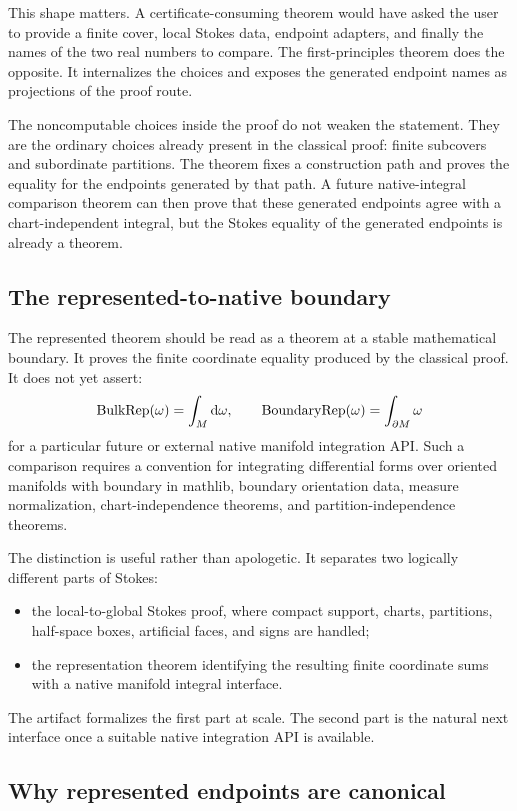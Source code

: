 This shape matters.  A certificate-consuming theorem would have asked the user
to provide a finite cover, local Stokes data, endpoint adapters, and finally
the names of the two real numbers to compare.  The first-principles theorem
does the opposite.  It internalizes the choices and exposes the generated
endpoint names as projections of the proof route.

The noncomputable choices inside the proof do not weaken the statement.  They
are the ordinary choices already present in the classical proof: finite
subcovers and subordinate partitions.  The theorem fixes a construction path
and proves the equality for the endpoints generated by that path.  A future
native-integral comparison theorem can then prove that these generated
endpoints agree with a chart-independent integral, but the Stokes equality of
the generated endpoints is already a theorem.

\subsection{The represented-to-native boundary}

The represented theorem should be read as a theorem at a stable mathematical
boundary.  It proves the finite coordinate equality produced by the classical
proof.  It does not yet assert:
\[
  \operatorname{BulkRep}(\omega) = \int_M \mathrm{d}\omega,
  \qquad
  \operatorname{BoundaryRep}(\omega) = \int_{\partial M} \omega
\]
for a particular future or external native manifold integration API.  Such a
comparison requires a convention for integrating differential forms over
oriented manifolds with boundary in mathlib, boundary orientation data, measure
normalization, chart-independence theorems, and partition-independence
theorems.

The distinction is useful rather than apologetic.  It separates two logically
different parts of Stokes:
\begin{itemize}
  \item the local-to-global Stokes proof, where compact support, charts,
  partitions, half-space boxes, artificial faces, and signs are handled;
  \item the representation theorem identifying the resulting finite coordinate
  sums with a native manifold integral interface.
\end{itemize}
The artifact formalizes the first part at scale.  The second part is the
natural next interface once a suitable native integration API is available.

\subsection{Why represented endpoints are canonical}


